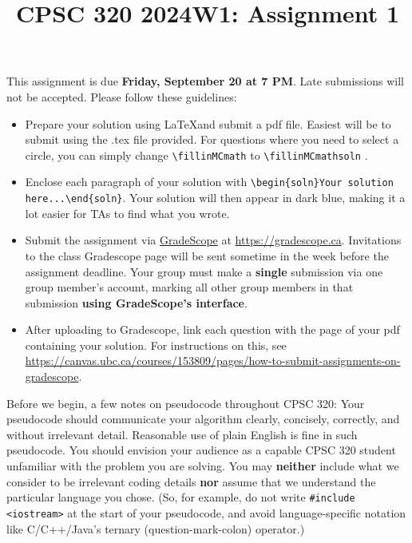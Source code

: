 \documentclass[11pt,fleqn]{exam}
\author{}
\date{}
\title{CPSC 320 2024W1: Assignment 1}
\newcommand{\fillinMCmath}[1]{\begin{tikzpicture}\draw circle [radius=0.5em];\end{tikzpicture}\ #1}
\newcommand{\fillinMCmathsoln}[1]{\begin{tikzpicture}\draw[black, fill=blue] circle [radius=0.5em];\end{tikzpicture}\ #1}
\newenvironment{soln}{\color{solnblue}}{}
\begin{document}
\maketitle
\vspace{-0.5in} This assignment is due \textbf{Friday, September 20 at 7 PM}. Late submissions will not be accepted. Please follow these guidelines:
\begin{itemize}
  \item Prepare your  solution using \LaTeX and submit  a pdf file. Easiest will be to submit using
        the .tex file provided. For questions where you  need to select a circle, you can simply
        change \verb~\fillinMCmath~ to \verb~\fillinMCmathsoln~ .

  \item Enclose each paragraph of your solution with
        \verb~\begin{soln}Your solution here...\end{soln}~.
        \begin{soln}Your  solution will  then appear  in dark  blue\end{soln}, making  it a  lot
        easier for TAs to find what you wrote.

  \item   Submit   the    assignment   via   \href{https://gradescope.ca/}{GradeScope}   at
        \url{https://gradescope.ca}. Invitations to the class Gradescope page will be sent sometime in the week before the assignment deadline. Your group must make  a \textbf{single} submission via one
        group member's account, marking all other group members in that submission \textbf{using
          GradeScope's interface}.

  \item  After uploading  to  Gradescope, link  each  question  with the  page  of your  pdf
        containing your solution. For instructions on this,
        see \\ \url{https://canvas.ubc.ca/courses/153809/pages/how-to-submit-assignments-on-gradescope}.
\end{itemize}

Before we  begin, a few  notes on pseudocode throughout  CPSC 320: Your  pseudocode should
communicate your algorithm  clearly, concisely, correctly, and  without irrelevant detail.
Reasonable use  of plain  English is  fine in  such pseudocode.  You should  envision your
audience as a capable CPSC 320 student unfamiliar with the problem you are solving. You may \textbf{neither} include what we consider to be irrelevant coding details \textbf{nor} assume that  we understand the particular  language you
chose. (So, for example,  do not write \texttt{\#include <iostream>} at  the start of your
pseudocode,   and    avoid   language-specific   notation   like    C/C++/Java's   ternary
(question-mark-colon) operator.)
\end{document}
